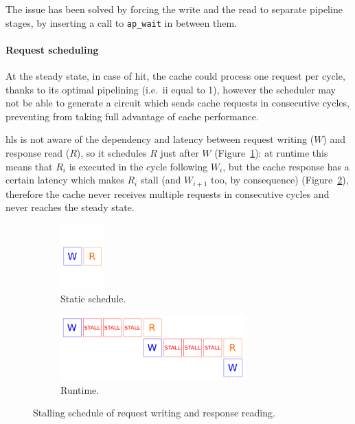 \documentclass[11pt,a4paper,oneside]{memoir}
\begin{document}
The issue has been solved by forcing the write and the read to separate pipeline
stages, by inserting a call to \texttt{ap\_wait} in between them.

\paragraph{Request scheduling}
At the steady state, in case of hit, the cache could process one request per
cycle, thanks to its optimal pipelining (i.e.\ \ac{ii} equal to 1), however the
scheduler may not be able to generate a circuit which sends cache requests in
consecutive cycles, preventing from taking full advantage of cache performance.

\ac{hls} is not aware of the dependency and latency between request writing
($W$) and response read ($R$), so it schedules $R$ just after $W$
(Figure~\ref{subfig:actual_sched_static}): at runtime this means that $R_i$ is
executed in the cycle following $W_i$, but the cache response has a certain
latency which makes $R_i$ stall (and $W_{i+1}$ too, by
consequence) (Figure~\ref{subfig:actual_sched_run}), therefore the cache never
receives multiple requests in consecutive cycles and never reaches the steady
state.

\begin{figure}[!htb]
	\centering
	\begin{subfigure}[b]{.3\textwidth}
		\centering
		\includegraphics[height=2.5cm]{actual_schedule_static}
		\caption{Static schedule.}
		\label{subfig:actual_sched_static}
	\end{subfigure}
	\hfill
	\begin{subfigure}[b]{.68\textwidth}
		\centering
		\includegraphics[height=2.5cm]{actual_schedule_run}
		\caption{Runtime.}
		\label{subfig:actual_sched_run}
	\end{subfigure}
	\caption{Stalling schedule of request writing and response reading.}
	\label{fig:actual_sched}
\end{figure}
\end{document}
